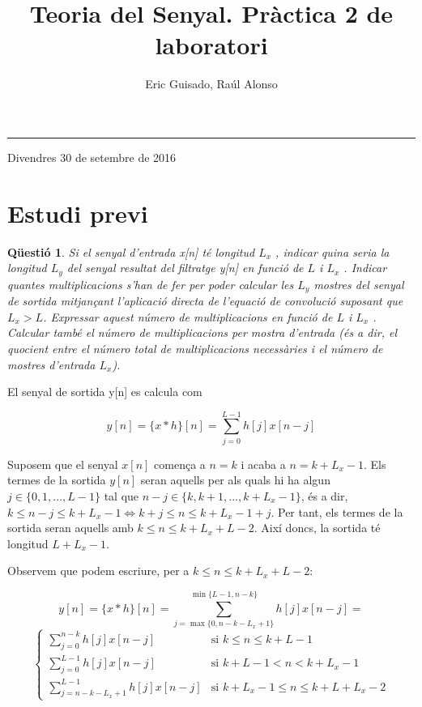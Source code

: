 \documentclass[11pt,a4]{article}
\title{Teoria del Senyal. Pràctica 2 de laboratori}
\author{Eric Guisado, Raúl Alonso}
\numberwithin{equation}{section}
\theoremstyle{thmstyle}
\theoremstyle{thmstyle}
\theoremstyle{thmstyle}
\theoremstyle{thmstyle}
\theoremstyle{thmstyle}
\theoremstyle{thmstyle}
\newtheorem{question}{Qüestió}
\begin{document}
\thispagestyle{empty}

\noindent
{\bf \LARGE \thetitle}

\noindent
\rule{\textwidth}{1pt}

\vspace{15pt}

\noindent
{\Large \theauthor}
\vspace{15pt}

\noindent
{\large Divendres 30 de setembre de 2016}
\vspace{15pt}

\tableofcontents

\section{Estudi previ}
\begin{question}
Si el senyal d’entrada x[n] té longitud $L_x$ , indicar quina seria la longitud $L_y$ del
senyal resultat del filtratge y[n] en funció de $L$ i $L_x$ . Indicar quantes multiplicacions s’han de
fer per poder calcular les $L_y$ mostres del senyal de sortida mitjançant l’aplicació directa de
l’equació de convolució suposant que $L_x > L$. Expressar aquest número de multiplicacions en
funció de $L$ i $L_x$ . Calcular també el número de multiplicacions per mostra d’entrada (és a dir,
el quocient entre el número total de multiplicacions necessàries i el número de mostres
d’entrada $L_x$).
\end{question}

El senyal de sortida y[n] es calcula com 

$$
y[n]=\lbrace x\ast h\rbrace[n]=\sum\limits_{j=0}^{L-1} h[j]x[n-j]
$$

Suposem que el senyal $x[n]$ comença a $n=k$ i acaba a $n=k+L_x-1$. Els termes de la sortida $y[n]$ seran aquells per als quals hi ha algun $j\in\lbrace 0, 1, ..., L-1\rbrace$ tal que $n-j\in \lbrace k, k+1, ..., k+L_x-1\rbrace$, és a dir, $k\leqslant n-j \leqslant k+L_x-1 \Longleftrightarrow k+j\leqslant n \leqslant k+L_x-1+j$. Per tant, els termes de la sortida seran aquells amb $k\leqslant n \leq k+L_x+L-2$. Així doncs, la sortida té longitud $L+L_x-1$.

Observem que podem escriure, per a $k\leqslant n \leq k+L_x+L-2$:

$$
y[n]=\lbrace x\ast h\rbrace[n]=\sum\limits_{j=\max{\lbrace 0, n-k-L_x+1\rbrace}}^{\min{\lbrace L-1,n-k\rbrace}} h[j]x[n-j] = 
$$
$$
\begin{cases}
\sum\limits_{j=0}^{n-k} h[j]x[n-j]  & \text{si $k \leqslant n \leqslant k + L - 1$} \\
\sum\limits_{j=0}^{L-1} h[j]x[n-j]  & \text{si $k+L-1 < n < k + L_x - 1$} \\
\sum\limits_{j=n-k-L_x+1}^{L-1} h[j]x[n-j]  & \text{si $k + L_x - 1 \leqslant n \leqslant k + L + L_x - 2$}
\end{cases}
$$
\end{document}
